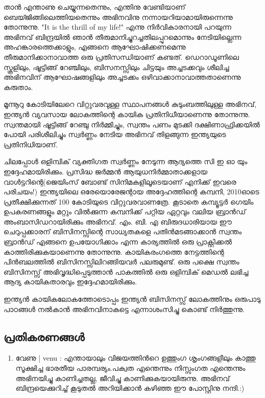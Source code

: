 \vskip 2pt

താന്‍ എന്താണു ചെയ്യുന്നതെന്നും, എന്തിനു വേണ്ടിയാണ് ബെയ്ജിങ്ങിലെത്തിയതെന്നും അഭിനവിനു നന്നായറിയാമായിരുന്നെന്നു തോന്നുന്നു. "It is the thrill of my life!" എന്നു നിര്‍വികാരനായി പറയുന്ന അഭിനവ് ബിന്ദ്രയില്‍ ഞാന്‍ തീരുമാനിച്ചുറച്ചതിലപ്പുറമൊന്നും നേടിയില്ലെന്ന അഹങ്കാരത്തെക്കാളും, എങ്ങനെ ആഘോഷിക്കണമെന്നു തീരുമാനിക്കാനാവാത്ത ഒരു പ്രതിസന്ധിയാണ് കണ്ടത്. ഡെറാഡൂണിലെ സ്കൂളിലും, ഷൂട്ടിങ്ങ് റേഞ്ചിലും, ബിസനസ്സിലും ചിട്ടയും അച്ചടക്കവും ശീലിച്ച അഭിനവിന് ആഘോഷങ്ങളിലും അച്ചടക്കം ഒഴിവാക്കാനാവാത്തതാണെന്നു കരുതാം.

മൂന്നൂറു കോടിയിലേറെ വിറ്റുവരവുള്ള സ്ഥാപനങ്ങള്‍ കുടുംബത്തിലുള്ള അഭിനവ്, ഇന്ത്യന്‍ വ്യവസായ ലോകത്തിന്റെ കായിക പ്രതിനിധീയാണെന്നു തോന്നുന്നു. സ്വന്തമായി ഷൂട്ടിങ്ങ് റേഞ്ചു നിര്‍മ്മിച്ചും, സ്വന്തം പണം മുടക്കി ദക്ഷിണാഫ്രിക്കയില്‍ പോയി പരിശീലിച്ചും സ്വര്‍ണ്ണം നേടിയ അഭിനവ് തിളങ്ങുന്ന ഇന്ത്യയുടെ പ്രതിനിധിയാണ്.

ചിലപ്പോള്‍ ഒളിമ്പിക് വ്യക്തിഗത സ്വര്‍ണ്ണം നേടുന്ന ആദ്യത്തെ സി ഇ ഓ യും ഇദ്ദേഹമായിരിക്കും. പ്രസിദ്ധ ജര്‍മ്മന്‍ ആയുധനിര്‍മ്മാതാക്കളായ വാള്‍ട്ടറിന്റെ(ജെയിംസ് ബോണ്ട് സിനിമകളിലൂടെയാണ് എനിക്ക് ഇവരെ പരിചയം!) ഇന്ത്യയിലെ ഒരേയൊരേജന്റായ അദ്ദേഹത്തിന്റെ കമ്പനി, 2010ഓടെ പ്രതീക്ഷിക്കുന്നത് 100 കോടിയുടെ വിറ്റുവരവാണത്രേ. കൂടാതെ കമ്പ്യൂട്ടര്‍ ഗെയിം ഉപകരണങ്ങളും മറ്റും വില്‍ക്കുന്ന കമ്പനിക്ക് പറ്റിയ ഏറ്റവും വലിയ ബ്രാന്‍ഡ് അംബാസിഡറായിരിക്കും അഭിനവ്. എം. ബി. എ ബിരുദധാരിയായ ഈ ചെറുപ്പക്കാരന് ബിസിനസ്സിന്റെ സാധ്യതകളെ പതിന്‍മടങ്ങാക്കാന്‍ സ്വന്തം ബ്രാന്‍ഡ് എങ്ങനെ ഉപയോഗിക്കാം എന്ന കാര്യത്തില്‍ ഒരു പ്രാക്റ്റിക്കല്‍ കാത്തിരിക്കുകയാണെന്നു തോന്നുന്നു. കായികരംഗത്തെ നേട്ടത്തിന്റെ പിന്‍ബലത്തില്‍ ബിസിനസ്സിലിറങ്ങിയവര്‍ പലരുമുണ്ട്. ഒരു പക്ഷെ സ്വന്തം ബിസിനസ്സ് അഭിവൃദ്ധിപ്പെടുത്താന്‍ പാകത്തില്‍ ഒരു ഒളിമ്പിക് മെഡല്‍ ലഭിച്ച ആദ്യ കായികതാരവും ഇദ്ദേഹമായിരിക്കും.

ഇന്ത്യന്‍ കായികലോകത്തോടൊപ്പം ഇന്ത്യന്‍ ബിസിനസ്സ് ലോകത്തിനും ഒരുപാടു പാഠങ്ങള്‍ നല്‍കാന്‍ അഭിനവിനാകട്ടെ എന്നാശംസിച്ചു കൊണ്ട് നിര്‍ത്തുന്നു.

\subsection*{പ്രതികരണങ്ങള്‍}
\begin{enumerate}
\item{വേണു | venu : }
എന്തായാലും വിജയത്തിന്‍റെ ഉത്തുംഗ ശൃംഗങ്ങളീലും കാത്തു സൂക്ഷിച്ച ഭാരതീയ പാരമ്പര്യം.പക്വത എന്തെന്നും നിസ്സംഗത എന്തെന്നും അഭിനയിച്ചു കാണിച്ചതല്ല, ജീവിച്ചു കാണിക്കുകയായിരുന്നു. അഭിനവ് ബിന്ദ്രയെക്കുറിച്ച് കൂടുതല്‍ അറിയിക്കാന്‍ കഴിഞ്ഞ ഈ പോസ്റ്റിനു നന്ദി.:)

\end{enumerate}

\newpage
